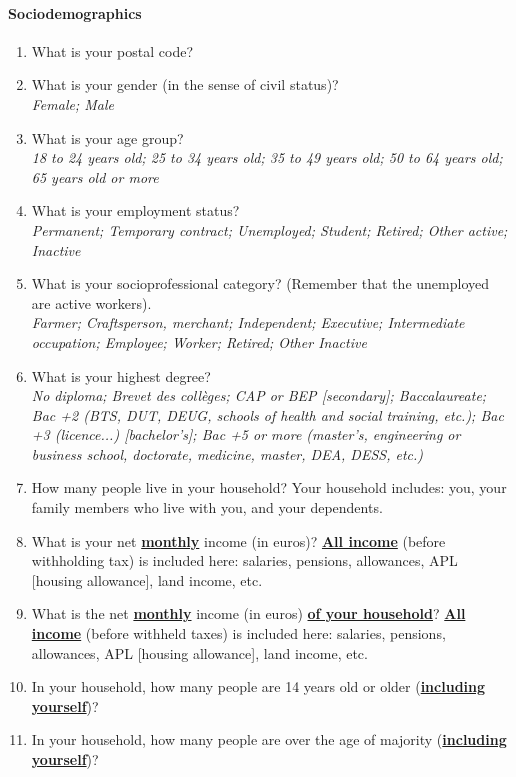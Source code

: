 \documentclass[12pt]{article} %
\begin{document}
\begin{appendices}
\paragraph{Sociodemographics}
\begin{enumerate}[resume,leftmargin=*]
\item What is your postal code? 
\item What is your gender (in the sense of civil status)? \emph{}\\
\emph{Female; Male }
\item What is your age group? \emph{}\\
\emph{18 to 24 years old; 25 to 34 years old; 35 to 49 years old;
50 to 64 years old; 65 years old or more} 
\item What is your employment status? \emph{}\\
\emph{Permanent; Temporary contract; Unemployed; Student; Retired;
Other active; Inactive}
\item What is your socioprofessional category? (Remember that the unemployed
are active workers). \emph{}\\
\emph{Farmer; Craftsperson, merchant; Independent; Executive; Intermediate
occupation; Employee; Worker; Retired; Other Inactive} 
\item What is your highest degree? \emph{}\\
\emph{No diploma; Brevet des collèges; CAP or BEP {[}secondary{]};
Baccalaureate; Bac +2 (BTS, DUT, DEUG, schools of health and social
training, etc.); Bac +3 (licence...) {[}bachelor's{]}; Bac +5 or more (master's,
engineering or business school, doctorate, medicine, master, DEA,
DESS, etc.)}
\item How many people live in your household? Your household includes: you, your
family members who live with you, and your dependents. 
\item What is your net \textbf{\underline{monthly}} income (in euros)? \textbf{\underline{All
income}} (before withholding tax) is included here: salaries, pensions,
allowances, APL {[}housing allowance{]}, land income, etc. 
\item What is the net \textbf{\underline{monthly}} income (in euros) \textbf{\underline{of
your household}}? \textbf{\underline{All income}} (before withheld
taxes) is included here: salaries, pensions, allowances, APL {[}housing
allowance{]}, land income, etc. 
\item In your household, how many people are 14 years old or older (\textbf{\underline{including
yourself}})? 
\item In your household, how many people are over the age of majority
(\textbf{\underline{including
yourself}})? 
\end{enumerate}


\end{appendices}
\end{document}
